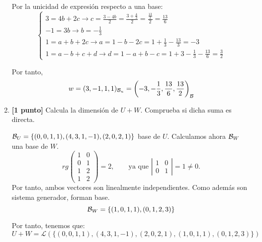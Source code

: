 \documentclass[12pt]{article}
\begin{document}
\begin{ejercicio}
\begin{enumerate}
        Por la unicidad de expresión respecto a una base:
        \begin{equation*}
            \left\{\begin{array}{l}
                3 = 4b+2c \longrightarrow c=\frac{3-4b}{2} = \frac{3+\frac{4}{3}}{2} = \frac{\frac{13}{3}}{2} = \frac{13}{6} \\
                -1 = 3b \longrightarrow b=-\frac{1}{3} \\
                1=a+b+2c \longrightarrow a=1-b-2c = 1+\frac{1}{3} -\frac{13}{3} = -3 \\
                1 = a-b+c+d \longrightarrow d=1-a+b-c = 1+3-\frac{1}{3} - \frac{13}{6} = \frac{3}{2}
            \end{array}\right.
        \end{equation*}

        Por tanto,
        \begin{equation*}
            w = (3,-1,1,1)_{\mathcal{B}_u} = \left(-3,-\frac{1}{3},\frac{13}{6},\frac{13}{2}\right)_{\mathcal{B}}
        \end{equation*}
        
        \item \textbf{[1 punto]} Calcula la dimensión de $U+W$. Comprueba si dicha suma es directa.

        $\mathcal{B}_U = \left\{(0,0,1,1),(4,3,1,-1), (2,0,2,1)\right\}$ base de $U$. Calculamos ahora $\mathcal{B}_W$ una base de $W$.
        \begin{equation*}
            rg\left(\begin{array}{cc}
                1 & 0 \\
                0 & 1 \\
                1 & 2 \\
                1 & 2
            \end{array}\right) = 2, \qquad \text{ya que }\left|\begin{array}{cc}
                1 & 0 \\
                0 & 1
            \end{array}\right| = 1\neq 0.
        \end{equation*}
        Por tanto, ambos vectores son linealmente independientes. Como además son sistema generador, forman base.
        \begin{equation*}
            \mathcal{B}_W=\{(1,0,1,1),(0,1,2,3)\}
        \end{equation*}

        Por tanto, tenemos que:
        \begin{equation*}
            U+W = \mathcal{L}\left(\{(0,0,1,1),(4,3,1,-1), (2,0,2,1),(1,0,1,1),(0,1,2,3)\}\right)
        \end{equation*}


\end{enumerate}
\end{ejercicio}
\end{document}
